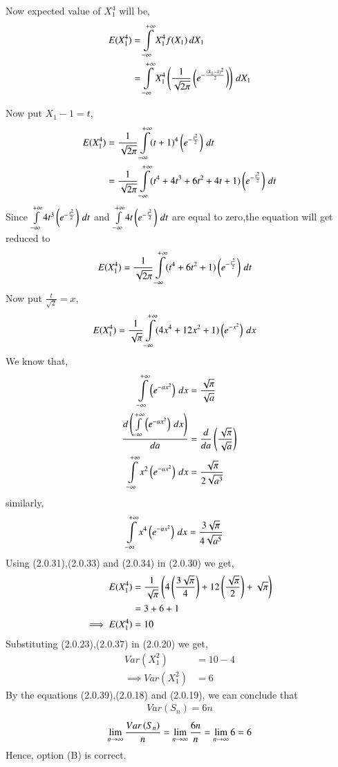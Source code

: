 \documentclass[journal,12pt,twocolumn]{IEEEtran}
\begin{document}
Now expected value of $X_{1}^{4}$ will be,
\begin{align}
   E(X_{1}^4)&=\int\limits_{-\infty}^{+\infty}X_{1}^{4}f(X_{1})\,dX_{1}
\\   &=\int\limits_{-\infty}^{+\infty}X_{1}^{4}\left(\frac{1}{\sqrt{2\pi}}\left(e^{-\frac{(X_{1}-1)^2}{2}}\right)\right)\,dX_{1}
\end{align}

Now put $X_{1}-1=t$,
\begin{align}
    E(X_{1}^4)&=\frac{1}{\sqrt{2\pi}}\int\limits_{-\infty}^{+\infty}(t+1)^{4}\left(e^{-\frac{t^{2}}{2}}\right)\,dt
\\ &=\frac{1}{\sqrt{2\pi}}\int\limits_{-\infty}^{+\infty}(t^{4}+4t^{3}+6t^{2}+4t+1)\left(e^{-\frac{t^{2}}{2}}\right)\,dt
\end{align}
Since $\int\limits_{-\infty}^{+\infty}4t^3\left(e^{-\frac{t^{2}}{2}}\right)\,dt$ and $\int\limits_{-\infty}^{+\infty}4t\left(e^{-\frac{t^{2}}{2}}\right)\,dt$ are equal to zero,the equation will get reduced to
\begin{align}
    E(X_{1}^4)&=\frac{1}{\sqrt{2\pi}}\int\limits_{-\infty}^{+\infty}(t^{4}+6t^{2}+1)\left(e^{-\frac{t^{2}}{2}}\right)\,dt
\end{align}
Now put $\frac{t}{\sqrt{2}}=x$,
\begin{align}
    E(X_{1}^4)&=\frac{1}{\sqrt{\pi}}\int\limits_{-\infty}^{+\infty}(4x^{4}+12x^{2}+1)\left(e^{-x^{2}}\right)\,dx
\end{align}
We know that,
\begin{align}
\int\limits_{-\infty}^{+\infty}\left(e^{-ax^{2}}\right)\,dx&=\frac{\sqrt{\pi}}{\sqrt{a}}
\\\frac{d\left(\int\limits_{-\infty}^{+\infty}\left(e^{-ax^{2}}\right)\,dx\right)}{da}&=\frac{d}{da}\left(\frac{\sqrt{\pi}}{\sqrt{a}}\right)
\\\int\limits_{-\infty}^{+\infty}x^{2}\left(e^{-ax^{2}}\right)\,dx&=\frac{\sqrt{\pi}}{2\sqrt{a^3}}
\end{align}
similarly,
\begin{align}
    \int\limits_{-\infty}^{+\infty}x^{4}\left(e^{-ax^{2}}\right)\,dx&=\frac{3\sqrt{\pi}}{4\sqrt{a^5}}
\end{align}
Using (2.0.31),(2.0.33) and (2.0.34) in (2.0.30) we get,
\begin{align}
     E(X_{1}^4)&=\frac{1}{\sqrt{\pi}}\left(4\left(\frac{3\sqrt{\pi}}{4}\right)+12\left(\frac{\sqrt{\pi}}{2}\right)+\sqrt{\pi}\right)
     \\&=3+6+1
    \\\implies  E(X_{1}^4)&=10
\end{align}
Substituting (2.0.23),(2.0.37) in (2.0.20) we get,
\begin{align}
    Var(X_{1}^{2})&=10-4
    \\\implies Var(X_{1}^{2})&=6
\end{align}
By the equations (2.0.39),(2.0.18) and (2.0.19), we can conclude that 
\begin{align}
    Var(S_{n})=6n
\end{align}
$$\lim_{n \to \infty}{\frac{Var\left(S_{n}\right)}{n}}=\lim_{n \to \infty}{\frac{6n}{n}}=\lim_{n \to \infty}{6}=6$$
Hence, option (B) is correct.
\end{document}
